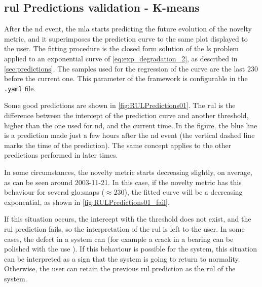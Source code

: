 \subsection{\gls{rul} Predictions validation - K-means}
After the \gls{nd} event, the \gls{mla} starts predicting the future evolution of the novelty metric, and it superimposes the prediction curve to the same plot displayed to the user. The fitting procedure is the closed form solution of the \gls{ls} problem applied to an exponential curve of \autoref{eq:exp_degradation_2}, as described in \autoref{sec:predictions}. The samples used for the regression of the curve are the last 230 before the current one. This parameter of the framework is configurable in the \texttt{.yaml} file. 

Some good predictions are shown in \autoref{fig:RULPredictions01}. The \gls{rul} is the difference between the intercept of the prediction curve and another threshold, higher than the one used for \gls{nd}, and the current time. In the figure, the blue line is a prediction made just a few hours after the \gls{nd} event (the vertical dashed line marks the time of the prediction). The same concept applies to the other predictions performed in later times.

In some circumstances, the novelty metric starts decreasing slightly, on average, as can be seen around 2003-11-21. In this case, if the novelty metric has this behaviour for several \gls{glo:snap}s ($\approx 230$), the fitted curve will be a decreasing exponential, as shown in \autoref{fig:RULPredictions01_fail}. 

If this situation occurs, the intercept with the threshold does not exist, and the \gls{rul} prediction fails, so the interpretation of the \gls{rul} is left to the user. In some cases, the defect in a system can  (for example a crack in a bearing can be polished with the use \cite{IMSpaper}). If this behaviour is possible for the system, this situation can be interpreted as a sign that the system is going to return to normality. Otherwise, the user can retain the previous \gls{rul} prediction as the \gls{rul} of the system.

